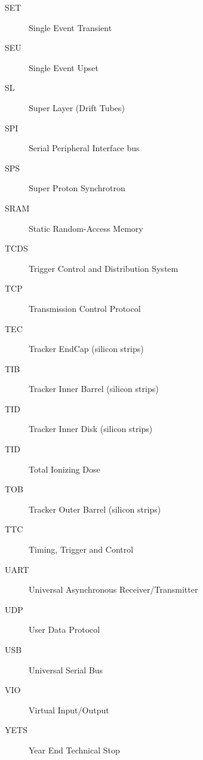 \begin{description}
    \item[SET]          \dotfill  Single Event Transient
    \item[SEU]          \dotfill  Single Event Upset
    \item[SL]          \dotfill  Super Layer (Drift Tubes)
    \item[SPI]          \dotfill  Serial Peripheral Interface bus
    \item[SPS]          \dotfill  Super Proton Synchrotron
    \item[SRAM]          \dotfill  Static Random-Access Memory
    \item[TCDS]          \dotfill  Trigger Control and Distribution System
    \item[TCP]          \dotfill  Transmission Control Protocol
    \item[TEC]          \dotfill  Tracker EndCap (silicon strips)
    \item[TIB]          \dotfill  Tracker Inner Barrel (silicon strips)
    \item[TID]          \dotfill  Tracker Inner Disk (silicon strips)
    \item[TID]          \dotfill  Total Ionizing Dose
    \item[TOB]          \dotfill  Tracker Outer Barrel (silicon strips)
    \item[TTC]          \dotfill  Timing, Trigger and Control
    \item[UART]          \dotfill  Universal Asynchronous Receiver/Transmitter
    \item[UDP]          \dotfill  User Data Protocol
    \item[USB]          \dotfill  Universal Serial Bus
    \item[VIO]          \dotfill  Virtual Input/Output
    \item[YETS]          \dotfill  Year End Technical Stop

  \end{description}
